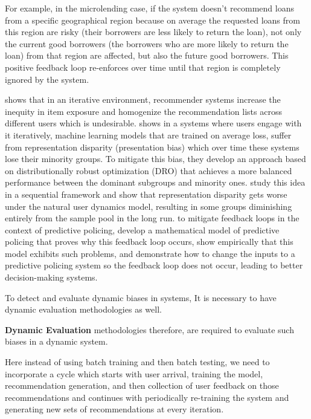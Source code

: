     For example, in the microlending case, if the system doesn't recommend loans from a specific geographical region because on average the requested loans from this region are risky (their borrowers are less likely to return the loan), not only the current good borrowers (the borrowers who are more likely to return the loan) from that region are affected, but also the future good borrowers. This positive feedback loop re-enforces over time until that region is completely ignored by the system.
    
    \cite{Chaney2018Homo} shows that in an iterative environment, recommender systems increase the inequity in item exposure and homogenize the recommendation lists across different users which is undesirable. \cite{pmlr-v80-hashimoto18a} shows in a systems where users engage with it iteratively, machine learning models that are trained on average loss, suffer from representation disparity (presentation bias) which over time these systems lose their minority groups. To mitigate this bias, they develop an approach based on distributionally robust optimization (DRO) that achieves a more balanced performance between the dominant subgroups and minority ones. \cite{NEURIPS2019_7690dd4d} study this idea in a sequential framework and show that representation disparity gets worse under the natural user dynamics model, resulting in some groups diminishing entirely from the sample pool in the long run. to mitigate feedback loops in the context of predictive policing, \cite{pmlr-v81-ensign18a} develop a mathematical model of predictive policing that proves why this feedback loop occurs, show empirically that this model exhibits such problems, and demonstrate how to change the inputs to a predictive policing system so the feedback loop does not occur, leading to better decision-making systems.
    
    To detect and evaluate dynamic biases in systems, It is necessary to have dynamic evaluation methodologies as well.
    
    \textbf{Dynamic Evaluation} methodologies therefore, are required to evaluate such biases in a dynamic system.
    
    Here instead of using batch training and then batch testing, we need to incorporate a cycle which starts with user arrival, training the model, recommendation generation, and then collection of user feedback on those recommendations and continues with periodically re-training the system and generating new sets of recommendations at every iteration.
    

